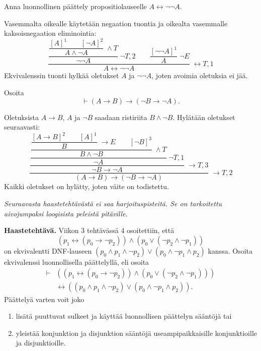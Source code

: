 \documentclass[11pt,a4paper]{amsart}
\begin{document}
\begin{exercise}
Anna luonnollinen päättely propositiolauseelle \(A \leftrightarrow \neg\neg A\).
\end{exercise}

\begin{solution}
Vasemmalta oikealle käytetään negaation tuontia ja oikealta vasemmalle
kaksoisnegaation eliminointia:
\[
\dfrac{
\dfrac{
\dfrac{[A]^1\qquad[\neg A]^2}{A\land\neg A}\;\land T
}{\neg\neg A}\;\neg T,2
\qquad
\dfrac{[\neg\neg A]^1}{A}\;\neg E
}{A\leftrightarrow\neg\neg A}\;\leftrightarrow T,1
\]
Ekvivalenssin tuonti hylkää oletukset \(A\) ja \(\neg\neg A\),
joten avoimia oletuksia ei jää.
\end{solution}

\begin{exercise}
Osoita
\[
\vdash (A \rightarrow B) \rightarrow (\neg B \rightarrow \neg A).
\]
\end{exercise}

\begin{solution}
Oletuksista \(A\to B\), \(A\) ja \(\neg B\) saadaan ristiriita
\(B\land\neg B\). Hylätään oletukset seuraavasti:
\[
\dfrac{
\dfrac{
\dfrac{
\dfrac{
  \dfrac{[A\to B]^2\qquad[A]^1}{B}\;\to E
  \qquad[\neg B]^3
}{B\land\neg B}\;\land T
}{\neg A}\;\neg T,1
}{\neg B\to\neg A}\;\to T,3
}{(A\to B)\to(\neg B\to\neg A)}\;\to T,2
\]
Kaikki oletukset on hylätty, joten väite on todistettu.
\end{solution}

\newpage
\noindent\emph{Seuraavasta haastetehtävästä ei saa harjoituspisteitä.
Se on tarkoitettu aivojumpaksi loogisista peleistä pitäville.}

\medskip
\noindent\textbf{Haastetehtävä.} Viikon 3 tehtävässä 4 osoitettiin, että
\[
(p_1 \leftrightarrow (p_0 \rightarrow \neg p_2))
\land (p_0 \lor (\neg p_2 \land \neg p_1))
\]
on ekvivalentti DNF-lauseen
\((p_0 \land p_1 \land \neg p_2) \lor (p_0 \land \neg p_1 \land p_2)\)
kanssa. Osoita ekvivalenssi luonnollisella päättelyllä, eli osoita
\[
\begin{aligned}
\vdash {} & ((p_1 \leftrightarrow (p_0 \rightarrow \neg p_2))
\land (p_0 \lor (\neg p_2 \land \neg p_1))) \\
& \leftrightarrow ((p_0 \land p_1 \land \neg p_2)
\lor (p_0 \land \neg p_1 \land p_2)).
\end{aligned}
\]
Päättelyä varten voit joko
\begin{enumerate}[label=\alph*), nosep]
\item lisätä puuttuvat sulkeet ja käyttää luonnollisen päättelyn sääntöjä tai
\item yleistää konjunktion ja disjunktion sääntöjä useampipaikkaisille
konjunktioille ja disjunktioille.
\end{enumerate}
\end{document}
